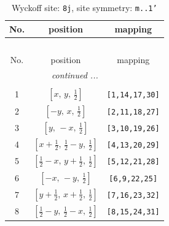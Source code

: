 \documentclass[fleqn,8pt]{jsarticle}
\begin{document}
\begin{longtable}{ccc}
\caption{Wyckoff site: {\tt 8j}, site symmetry: {\tt m..1'}}
 \\
 \hline \hline
No. & position & mapping \\ \hline \endfirsthead

\multicolumn{2}{l}{\tablename\ \thetable{}} \\
 \hline \hline
No. & position & mapping \\ \hline \endhead

 \hline \hline
\multicolumn{2}{r}{\footnotesize\it continued ...} \\ \endfoot

 \hline \hline
\multicolumn{2}{r}{} \\ \endlastfoot

1 & $\left[ x,\, y,\, \frac{1}{2} \right]$ & {\tt [1,14,17,30]} \\ \hline
2 & $\left[ - y,\, x,\, \frac{1}{2} \right]$ & {\tt [2,11,18,27]} \\ \hline
3 & $\left[ y,\, - x,\, \frac{1}{2} \right]$ & {\tt [3,10,19,26]} \\ \hline
4 & $\left[ x + \frac{1}{2},\, \frac{1}{2} - y,\, \frac{1}{2} \right]$ & {\tt [4,13,20,29]} \\ \hline
5 & $\left[ \frac{1}{2} - x,\, y + \frac{1}{2},\, \frac{1}{2} \right]$ & {\tt [5,12,21,28]} \\ \hline
6 & $\left[ - x,\, - y,\, \frac{1}{2} \right]$ & {\tt [6,9,22,25]} \\ \hline
7 & $\left[ y + \frac{1}{2},\, x + \frac{1}{2},\, \frac{1}{2} \right]$ & {\tt [7,16,23,32]} \\ \hline
8 & $\left[ \frac{1}{2} - y,\, \frac{1}{2} - x,\, \frac{1}{2} \right]$ & {\tt [8,15,24,31]} \\
\end{longtable}
\renewcommand{\arraystretch}{1.2}
\end{document}
